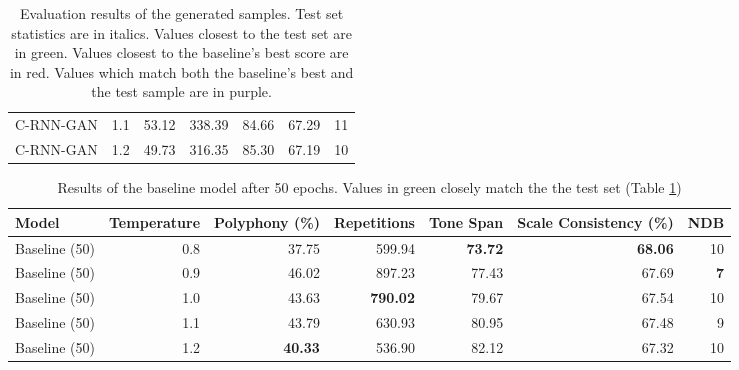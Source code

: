 \documentclass[a4paper]{book}
\begin{document}
\begin{landscape}
\begin{table}[t]
\begin{tabular}{l|r|r|r|r|r|r}
C-RNN-GAN         & 1.1         & 53.12          & 338.39          & 84.66          & 67.29            & 11      \\
C-RNN-GAN         & 1.2         & 49.73          & 316.35          & 85.30          & 67.19            & 10     
\end{tabular}
\caption{Evaluation results of the generated samples. Test set statistics are in italics. Values closest to the test set are in green. Values closest to the baseline's best score are in red. Values which match both the baseline's best and the test sample are in purple.}
\label{tab:results}
\end{table}

\begin{table}[b]
    \centering
\begin{tabular}{l|r|r|r|r|r|r}
    Model             & Temperature & Polyphony (\%)  & Repetitions       & Tone Span        & Scale Consistency (\%) & NDB     \\ \hline
Baseline (50) & 0.8 & 37.75 & 599.94 & \textbf{\color{base0D}73.72} & \textbf{\color{base0D}68.06} & 10 \\
Baseline (50) & 0.9 & 46.02 & 897.23 & 77.43 & 67.69 & \textbf{\color{base0D}7}  \\
Baseline (50) & 1.0 & 43.63 & \textbf{\color{base0D}790.02} & 79.67 & 67.54 & 10 \\
Baseline (50) & 1.1 & 43.79 & 630.93 & 80.95 & 67.48 & 9  \\
Baseline (50) & 1.2 & \textbf{\color{base0D}40.33} & 536.90 & 82.12 & 67.32 & 10
\end{tabular}
\caption{Results of the baseline model after 50 epochs. Values in green closely match the the test set (Table \ref{tab:results})}
\label{tab:base50}
\end{table}
\end{landscape}
\end{document}
